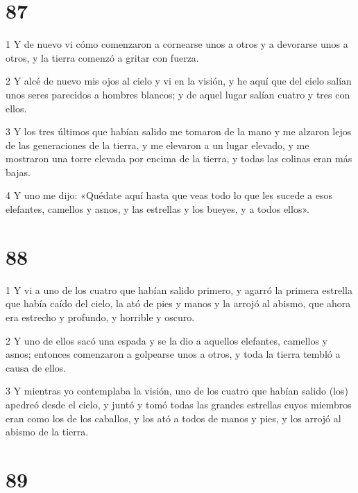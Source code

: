 \chapter{87}

\par 1 Y de nuevo vi cómo comenzaron a cornearse unos a otros y a devorarse unos a otros, y la tierra comenzó a gritar con fuerza.
\par 2 Y alcé de nuevo mis ojos al cielo y vi en la visión, y he aquí que del cielo salían unos seres parecidos a hombres blancos; y de aquel lugar salían cuatro y tres con ellos.
\par 3 Y los tres últimos que habían salido me tomaron de la mano y me alzaron lejos de las generaciones de la tierra, y me elevaron a un lugar elevado, y me mostraron una torre elevada por encima de la tierra, y todas las colinas eran más bajas.
\par 4 Y uno me dijo: «Quédate aquí hasta que veas todo lo que les sucede a esos elefantes, camellos y asnos, y las estrellas y los bueyes, y a todos ellos».

\chapter{88}

\par 1 Y vi a uno de los cuatro que habían salido primero, y agarró la primera estrella que había caído del cielo, la ató de pies y manos y la arrojó al abismo, que ahora era estrecho y profundo, y horrible y oscuro.
\par 2 Y uno de ellos sacó una espada y se la dio a aquellos elefantes, camellos y asnos; entonces comenzaron a golpearse unos a otros, y toda la tierra tembló a causa de ellos.
\par 3 Y mientras yo contemplaba la visión, uno de los cuatro que habían salido (los) apedreó desde el cielo, y juntó y tomó todas las grandes estrellas cuyos miembros eran como los de los caballos, y los ató a todos de manos y pies, y los arrojó al abismo de la tierra.

\chapter{89}

